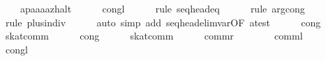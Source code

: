 \begin{isabellebody}
\ \ \ \ {}{}{}a{}{}p{}{}{}a{}{}a{}{}a{}{}a{}{}z{}{}halt{}{}\isanewline
\ \ \ \ \isamarkupfalse%
\ congl\isanewline
\ \ \ \ \isamarkupfalse%
\ {}rule\ seq{}head{}eq{}\isanewline
\ \ \ \ \isamarkupfalse%
\ {}rule\ arg{}cong{}\ \isamarkupfalse%
\isanewline
\ \ \ \ \isamarkupfalse%
\ {}rule\ plus{}indiv{}{}\isanewline
\ \ \ \ \isamarkupfalse%
\ {}auto\ simp\ add{}\ seq{}head{}elim{}var{}OF\ a{}test{}{}\isanewline
\ \ \ \ \isamarkupfalse%
\ cong\isanewline
\ \ \ \ \isamarkupfalse%
\ skat{}comm\isanewline
\ \ \ \ \isamarkupfalse%
\ cong\isanewline
\ \ \ \ \isamarkupfalse%
\ skat{}comm\isanewline
\ \ \ \ \isamarkupfalse%
\ {}commr{}\ {}\ {}{}\isanewline
\ \ \ \ \isamarkupfalse%
\ {}comml{}\ {}\ {}{}\isanewline
\ \ \ \ \isamarkupfalse%
\ congl\isanewline
\ \ \ \ \isamarkupfalse%

\end{isabellebody}
